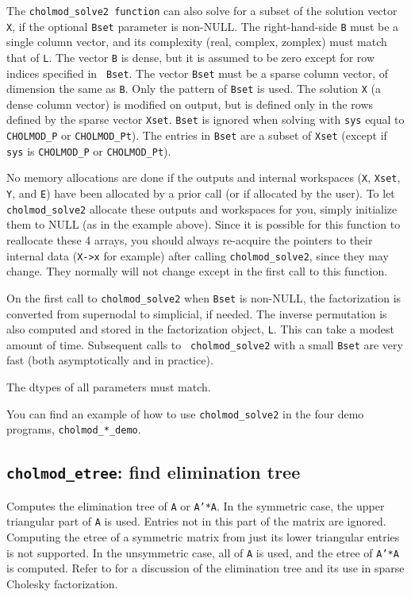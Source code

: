 \documentclass[11pt]{article}
\begin{document}
The {\tt cholmod\_solve2 function} can also solve for a subset of the solution
vector {\tt X}, if the optional {\tt Bset} parameter is non-NULL.  The
right-hand-side {\tt B} must be a single column vector, and its complexity
(real, complex, zomplex) must match that of {\tt L}.  The vector {\tt B} is
dense, but it is assumed to be zero except for row indices specified in {\tt
Bset}.  The vector {\tt Bset} must be a sparse column vector, of dimension the
same as {\tt B}.  Only the pattern of {\tt Bset} is used.  The solution {\tt X}
(a dense column vector) is modified on output, but is defined only in the rows
defined by the sparse vector {\tt Xset}.  {\tt Bset} is ignored when solving
with {\tt sys} equal to {\tt CHOLMOD\_P} or {\tt CHOLMOD\_Pt}).  The entries in
{\tt Bset} are a subset of {\tt Xset} (except if {\tt sys} is {\tt CHOLMOD\_P}
or {\tt CHOLMOD\_Pt}).

No memory allocations are done if the outputs and internal workspaces ({\tt X},
{\tt Xset}, {\tt Y}, and {\tt E}) have been allocated by a prior call (or if
allocated by the user).  To let {\tt cholmod\_solve2} allocate these outputs
and workspaces for you, simply initialize them to NULL (as in the example
above).  Since it is possible for this function to reallocate these 4 arrays,
you should always re-acquire the pointers to their internal data ({\tt X->x}
for example) after calling {\tt cholmod\_solve2}, since they may change.  They
normally will not change except in the first call to this function.

On the first call to {\tt cholmod\_solve2} when {\tt Bset} is non-NULL, the
factorization is converted from supernodal to simplicial, if needed.  The
inverse permutation is also computed and stored in the factorization object,
{\tt L}.  This can take a modest amount of time.  Subsequent calls to {\tt
cholmod\_solve2} with a small {\tt Bset} are very fast (both asymptotically and
in practice).

The dtypes of all parameters must match.

You can find an example of how to use {\tt cholmod\_solve2} in the
four demo programs, {\tt cholmod\_*\_demo}.

\subsection{{\tt cholmod\_etree}: find elimination tree}


Computes the elimination tree of {\tt A} or {\tt A'*A}.  In the symmetric case,
the upper triangular part of {\tt A} is used.  Entries not in this part of the
matrix are ignored.  Computing the etree of a symmetric matrix from just its
lower triangular entries is not supported.  In the unsymmetric case, all of
{\tt A} is used, and the etree of {\tt A'*A} is computed.  Refer to
\cite{Liu90a} for a discussion of the elimination tree and its use in sparse
Cholesky factorization.
\end{document}
